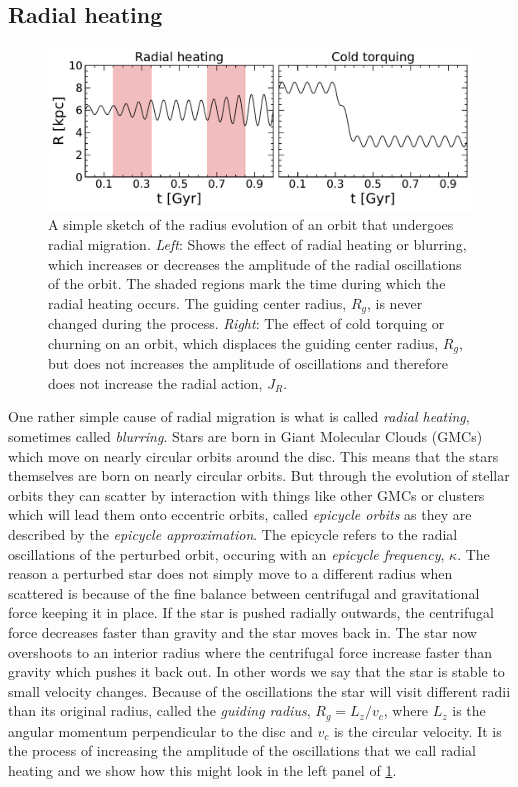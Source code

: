 \subsection{Radial heating}
\begin{figure}[t]
    \centering
    \includegraphics[width=1\textwidth]{images/radialmigration.pdf}
    \caption{A simple sketch of the radius evolution of an orbit that undergoes radial migration. \textit{Left}: Shows the effect of radial heating or blurring, which increases or decreases the amplitude of the radial oscillations of the orbit. The shaded regions mark the time during which the radial heating occurs. The guiding center radius, $R_g$, is never changed during the process. \textit{Right}: The effect of cold torquing or churning on an orbit, which displaces the guiding center radius, $R_g$, but does not increases the amplitude of oscillations and therefore does not increase the radial action, $J_R$.} %
    \label{fig:radialmigration}
\end{figure}

One rather simple cause of radial migration is what is called \textit{radial heating}, sometimes called \textit{blurring}. Stars are born in Giant Molecular Clouds (GMCs) which move on nearly circular orbits around the disc. This means that the stars themselves are born on nearly circular orbits. But through the evolution of stellar orbits they can scatter by interaction with things like other GMCs or clusters which will lead them onto eccentric orbits, called \textit{epicycle orbits} as they are described by the \textit{epicycle approximation}. The epicycle refers to the radial oscillations of the perturbed orbit, occuring with an \textit{epicycle frequency}, $\kappa$. The reason a perturbed star does not simply move to a different radius when scattered is because of the fine balance between centrifugal and gravitational force keeping it in place. If the star is pushed radially outwards, the centrifugal force decreases faster than gravity and the star moves back in. The star now overshoots to an interior radius where the centrifugal force increase faster than gravity which pushes it back out. In other words we say that the star is stable to small velocity changes. Because of the oscillations the star will visit different radii than its original radius, called the \textit{guiding radius}, $R_g = L_z / v_c$, where $L_z$ is the angular momentum perpendicular to the disc and $v_c$ is the circular velocity. It is the process of increasing the amplitude of the oscillations that we call radial heating and we show how this might look in the left panel of \ref{fig:radialmigration}. 

